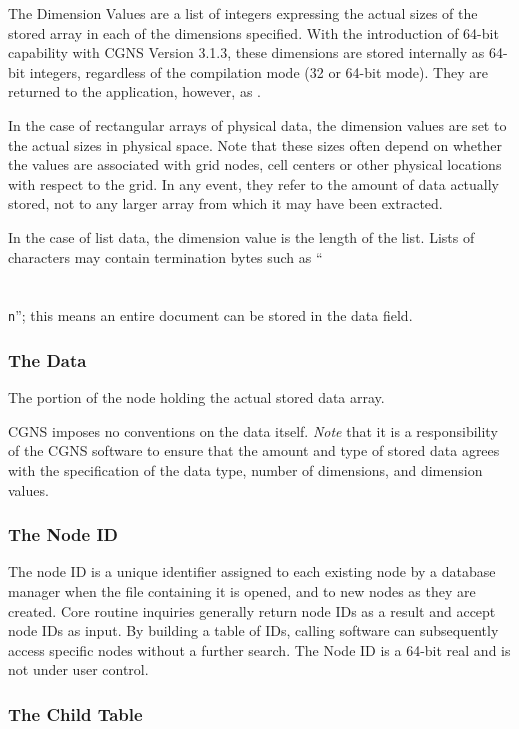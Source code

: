The Dimension Values are a list of integers expressing the actual sizes
of the stored array in each of the dimensions specified. With the
introduction of 64-bit capability with CGNS Version 3.1.3, these
dimensions are stored internally as 64-bit integers, regardless of the
compilation mode (32 or 64-bit mode). They are returned to the
application, however, as .

In the case of rectangular
arrays of physical data, the dimension values are set to the actual
sizes in physical space. Note that these sizes often depend on whether
the values are associated with grid nodes, cell centers or other
physical locations with respect to the grid. In any event, they refer to
the amount of data actually stored, not to any larger array from which
it may have been extracted.

In the case of list data, the dimension value is the length of the
list. Lists of characters may contain termination bytes such as
``\texttt{\\\\\\n}''; this means an entire document can be
stored in the data field.

\subsubsection{The Data}

The portion of the node holding the actual stored data array.

CGNS imposes no conventions on the data itself.
\textit{Note} that it is a responsibility of the CGNS software to ensure
that the amount and type of stored data agrees with the specification of
the data type, number of dimensions, and dimension values.

\subsubsection{The Node ID}

The node ID is a unique identifier assigned to each existing node by
a database manager when the file containing it is opened, and to new
nodes as they are created. Core routine inquiries generally return node
IDs as a result and accept node IDs as input. By building a table of IDs,
calling software can subsequently access specific nodes without a
further search. The Node ID is a 64-bit real and is not under user control.

\subsubsection{The Child Table}

